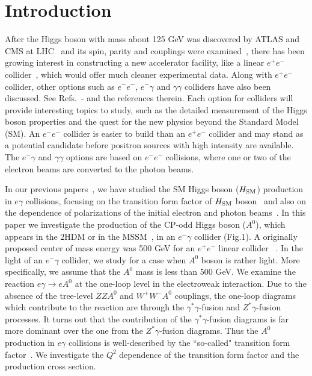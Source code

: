 \documentclass[final,5p,times,twocolumn]{elsarticle}
\begin{document}
\section{Introduction \label{introduction}}
After the Higgs boson with mass about 125 GeV was discovered by ATLAS and CMS 
at LHC~\cite{HiggsLHC} and its spin, parity and couplings were 
examined~\cite{SpinParity}, 
there has been growing interest in constructing a new 
accelerator facility, like a linear $e^+e^-$ collider~\cite{ILC}, which would 
offer much cleaner experimental data. Along with $e^+e^-$ collider, other options such as $e^-e^-$, $e^-\gamma$ and $\gamma\gamma$ colliders have also been discussed. See Refs.~\cite{DeRoeck}-\cite{GK} and the references therein. 
Each option for colliders will provide interesting topics to study, such as the detailed measurement of the Higgs boson properties and the quest for the new 
physics beyond the Standard Model (SM). An $e^-e^-$ collider is easier 
to build than an $e^+e^-$ collider and may stand as a potential candidate 
before positron sources with high intensity are available. The $e^-\gamma$ 
and $\gamma\gamma$ options are based on $e^-e^-$ collisions, where one or 
two of the electron beams are converted to the photon beams.

In our previous papers~\cite{KWSUPL,WKUSPRD}, we have studied the SM Higgs 
boson ($ H_{\rm SM}$) production in $e\gamma$ collisions, focusing on the transition form factor of  $H_{\rm SM}$ boson~\cite{KWSUPL} and also on the dependence of polarizations of the initial electron and photon beams~\cite{WKUSPRD}. 
In this paper we investigate the production of the CP-odd Higgs boson ($A^0$), 
which appears in the 2HDM or in the MSSM~\cite{Hunter}, in an $e^- \gamma$ collider (Fig.1).
A originally proposed center of mass energy was 500 GeV for an $e^+e^-$ linear 
collider 
~\cite{ILC}. In the light of an $e^- \gamma$ collider,  we study for a case when $A^0$ boson is rather light. More specifically, we assume that the $A^0$ mass is less than 500 GeV.
We examine the reaction $e\gamma\rightarrow eA^0$ at the one-loop level in 
the electroweak interaction. Due to the absence of the tree-level $ZZA^0$ and $W^+W^-A^0$ couplings, the one-loop diagrams which contribute to the reaction are through the $\gamma^*\gamma$-fusion and $Z^*\gamma$-fusion processes. It 
turns out that the contribution of the $\gamma^*\gamma$-fusion diagrams is 
far more dominant over  the one from the $Z^*\gamma$-fusion diagrams. 
Thus the $A^0$ production in $e\gamma$ collisions is well-described
by the ``so-called" transition form factor~\cite{KWSUPL}. We investigate 
the $Q^2$ dependence of the transition form factor and  the production cross 
section. 
\end{document}
